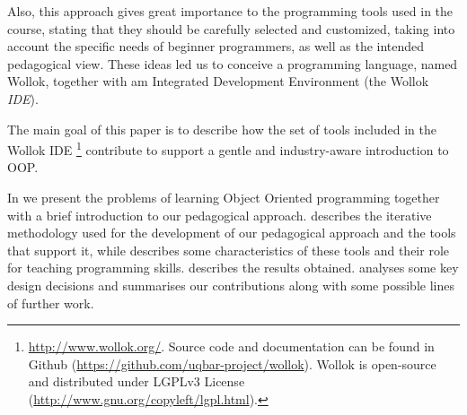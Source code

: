 Also, this approach gives great importance to the programming tools used in the course, 
stating that they should be carefully selected and customized, 
taking into account the specific needs of beginner programmers,
as well as the intended pedagogical view.
These ideas led us to conceive a programming language, named Wollok,
together with am Integrated Development Environment (the Wollok \emph{IDE}).

The main goal of this paper is to describe how the set of tools included in the Wollok IDE%
\footnote{
	\url{http://www.wollok.org/}. 
	Source code and documentation can be found in Github 
	(\url{https://github.com/uqbar-project/wollok}).
	Wollok is open-source and distributed under LGPLv3 License 
	(\url{http://www.gnu.org/copyleft/lgpl.html}).}
contribute to support a gentle and industry-aware introduction to OOP.



\medskip 
In  we present the problems of learning Object Oriented programming
together with a brief introduction to our pedagogical approach. 
 describes the iterative methodology 
used for the development of our pedagogical approach 
and the tools that support it,
while  describes some characteristics of these tools
and their role for teaching programming skills.
 describes the results obtained.
 analyses some key design decisions
and  summarises our contributions
along with some possible lines of further work.


